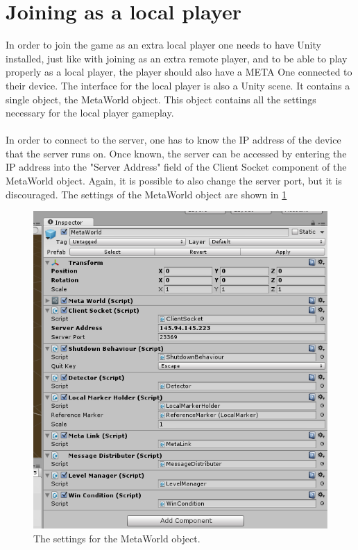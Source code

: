 \documentclass[]{report}
\begin{document}
\section*{Joining as a local player}
In order to join the game as an extra local player one needs to have Unity
installed, just like with joining as an extra remote player, and to be able
to play properly as a local player, the player should also have a META One
connected to their device. The interface for the local player is also
a Unity scene. It contains a single object, the MetaWorld object. This object
contains all the settings necessary for the local player gameplay.\\
\\
In order to connect to the server, one has to know the IP address of the
device that the server runs on. Once known, the server can be accessed by
entering the IP address into the "Server Address" field of the Client Socket
component of the MetaWorld object. Again, it is possible to also change the
server port, but it is discouraged. The settings of the MetaWorld object
are shown in \ref{fig:metaworld}
\begin{figure}[!ht]
	\centering
	\includegraphics[scale = 0.6]{MetaWorld}
	\caption{The settings for the MetaWorld object.}
	\label{fig:metaworld}
\end{figure}
\end{document}
